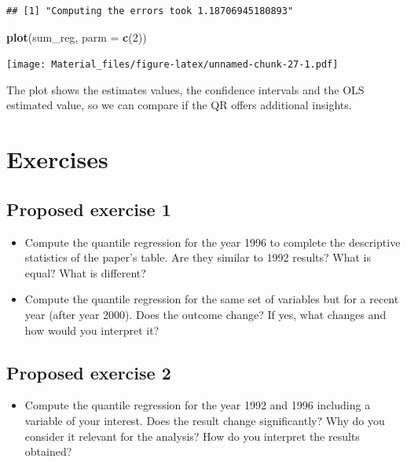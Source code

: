 \documentclass[]{book}
\newenvironment{Shaded}{\begin{snugshade}}{\end{snugshade}}
\newcommand{\KeywordTok}[1]{\textcolor[rgb]{0.13,0.29,0.53}{\textbf{#1}}}
\newcommand{\DataTypeTok}[1]{\textcolor[rgb]{0.13,0.29,0.53}{#1}}
\newcommand{\DecValTok}[1]{\textcolor[rgb]{0.00,0.00,0.81}{#1}}
\newcommand{\NormalTok}[1]{#1}
\providecommand{\tightlist}{%
  \setlength{\itemsep}{0pt}\setlength{\parskip}{0pt}}
\begin{document}
\begin{verbatim}
## [1] "Computing the errors took 1.18706945180893"
\end{verbatim}

\begin{Shaded}
\begin{Highlighting}[]
\KeywordTok{plot}\NormalTok{(sum_reg, }\DataTypeTok{parm =} \KeywordTok{c}\NormalTok{(}\DecValTok{2}\NormalTok{))}
\end{Highlighting}
\end{Shaded}

\texttt{[image: Material\_files/figure-latex/unnamed-chunk-27-1.pdf]}

The plot shows the estimates values, the confidence intervals and the
OLS estimated value, so we can compare if the QR offers additional
insights.

\section{Exercises}\label{exercises}

\subsection{Proposed exercise 1}\label{proposed-exercise-1}

\begin{itemize}
\tightlist
\item
  Compute the quantile regression for the year 1996 to complete the
  descriptive statistics of the paper's table. Are they similar to 1992
  results? What is equal? What is different?
\item
  Compute the quantile regression for the same set of variables but for
  a recent year (after year 2000). Does the outcome change? If yes, what
  changes and how would you interpret it?
\end{itemize}

\subsection{Proposed exercise 2}\label{proposed-exercise-2}

\begin{itemize}
\tightlist
\item
  Compute the quantile regression for the year 1992 and 1996 including a
  variable of your interest. Does the result change significantly? Why
  do you consider it relevant for the analysis? How do you interpret the
  results obtained?
\end{itemize}
\end{document}
